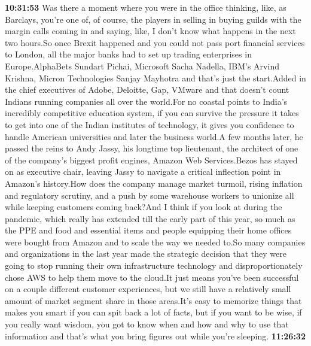 \documentclass{article}%
\begin{document}
\textbf{10:31:53}%
\newline%
Was there a moment where you were in the office thinking, like, as Barclays, you're one of, of course, the players in selling in buying guilds with the margin calls coming in and saying, like, I don't know what happens in the next two hours.So once Brexit happened and you could not pass port financial services to London, all the major banks had to set up trading enterprises in Europe.AlphaBets Sundart Pichai, Microsoft Sacha Nadella, IBM's Arvind Krishna, Micron Technologies Sanjay Mayhotra and that's just the start.Added in the chief executives of Adobe, Deloitte, Gap, VMware and that doesn't count Indians running companies all over the world.For no coastal points to India's incredibly competitive education system, if you can survive the pressure it takes to get into one of the Indian institutes of technology, it gives you confidence to handle American universities and later the business world.A few months later, he passed the reins to Andy Jassy, his longtime top lieutenant, the architect of one of the company's biggest profit engines, Amazon Web Services.Bezos has stayed on as executive chair, leaving Jassy to navigate a critical inflection point in Amazon's history.How does the company manage market turmoil, rising inflation and regulatory scrutiny, and a push by some warehouse workers to unionize all while keeping customers coming back?And I think if you look at during the pandemic, which really has extended till the early part of this year, so much as the PPE and food and essential items and people equipping their home offices were bought from Amazon and to scale the way we needed to.So many companies and organizations in the last year made the strategic decision that they were going to stop running their own infrastructure technology and disproportionately chose AWS to help them move to the cloud.It just means you've been successful on a couple different customer experiences, but we still have a relatively small amount of market segment share in those areas.It's easy to memorize things that makes you smart if you can spit back a lot of facts, but if you want to be wise, if you really want wisdom, you got to know when and how and why to use that information and that's what you bring figures out while you're sleeping.%
\textbf{11:26:32}%
\newline%
\end{document}
